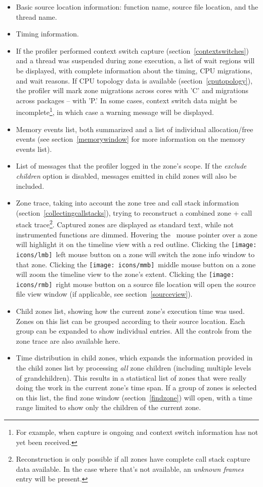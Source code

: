 \documentclass[hidelinks,titlepage,a4paper,twoside]{article}
\newcommand{\LMB}{\texttt{[image: icons/lmb]}}
\newcommand{\RMB}{\texttt{[image: icons/rmb]}}
\newcommand{\MMB}{\texttt{[image: icons/mmb]}}
\begin{document}
\begin{itemize}
\item Basic source location information: function name, source file location, and the thread name.
\item Timing information.
\item If the profiler performed context switch capture (section~\ref{contextswitches}) and a thread was suspended during zone execution, a list of wait regions will be displayed, with complete information about the timing, CPU migrations, and wait reasons. If CPU topology data is available (section~\ref{cputopology}), the profiler will mark zone migrations across cores with 'C' and migrations across packages -- with 'P.' In some cases, context switch data might be incomplete\footnote{For example, when capture is ongoing and context switch information has not yet been received.}, in which case a warning message will be displayed.
\item Memory events list, both summarized and a list of individual allocation/free events (see section~\ref{memorywindow} for more information on the memory events list).
\item List of messages that the profiler logged in the zone's scope. If the \emph{exclude children} option is disabled, messages emitted in child zones will also be included.
\item Zone trace, taking into account the zone tree and call stack information (section~\ref{collectingcallstacks}), trying to reconstruct a combined zone + call stack trace\footnote{Reconstruction is only possible if all zones have complete call stack capture data available. In the case where that's not available, an \emph{unknown frames} entry will be present.}. Captured zones are displayed as standard text, while not instrumented functions are dimmed. Hovering the \faMousePointer{}~mouse pointer over a zone will highlight it on the timeline view with a red outline. Clicking the \LMB{}~left mouse button on a zone will switch the zone info window to that zone. Clicking the \MMB{}~middle mouse button on a zone will zoom the timeline view to the zone's extent. Clicking the \RMB{}~right mouse button on a source file location will open the source file view window (if applicable, see section~\ref{sourceview}).
\item Child zones list, showing how the current zone's execution time was used. Zones on this list can be grouped according to their source location. Each group can be expanded to show individual entries. All the controls from the zone trace are also available here.
\item Time distribution in child zones, which expands the information provided in the child zones list by processing \emph{all} zone children (including multiple levels of grandchildren). This results in a statistical list of zones that were really doing the work in the current zone's time span. If a group of zones is selected on this list, the find zone window (section~\ref{findzone}) will open, with a time range limited to show only the children of the current zone.
\end{itemize}
\end{document}
